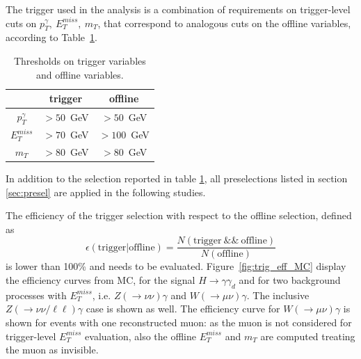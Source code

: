 
The trigger used in the analysis is a combination of requirements on trigger-level cuts on $p_T^\gamma,~E_T^{miss},~m_T$, that correspond to analogous cuts on the offline variables, according to Table~\ref{tab:trig_offline_cuts}.

\begin{table}[h]
  \begin{center}
    \begin{tabular}{c|cc}
      & trigger & offline \\
      \hline
      $p_T^\gamma$ & $>50$~GeV & $>50$~GeV \\
      $E_T^{miss}$ & $>70$~GeV & $>100$~GeV \\
      $m_T$        & $>80$~GeV & $>80$~GeV \\
    \end{tabular}
  \end{center}
  \caption{
    Thresholds on trigger variables and offline variables.
  }
  \label{tab:trig_offline_cuts}
\end{table}

In addition to the selection reported in table \ref{tab:trig_offline_cuts}, all preselections listed in section \ref{sec:presel} are applied in the following studies.

The efficiency of the trigger selection with respect to the offline selection, defined as
\begin{equation}
  \epsilon(\textrm{trigger}|\textrm{offline}) = \frac{ N(\textrm{trigger}~\&\&~\textrm{offline}) }{ N(\textrm{offline}) }
  \label{eq:trig_eff_wrt_offline}
\end{equation}
is lower than 100\% and needs to be evaluated. Figure~\ref{fig:trig_eff_MC} display the efficiency curves from MC, for the signal $H\to\gamma\gamma_d$ and for two background processes with $E_T^{miss}$, i.e. $Z(\to\nu\nu)\gamma$
and $W(\to\mu\nu)\gamma$. The inclusive $Z(\to\nu\nu/\ell\ell)\gamma$ case is shown as well. The efficiency curve for $W(\to\mu\nu)\gamma$ is shown for events with one reconstructed muon: as the muon is not considered for trigger-level $E_T^{miss}$ evaluation, also the offline $E_T^{miss}$ and $m_T$ are computed treating the muon as invisible.

